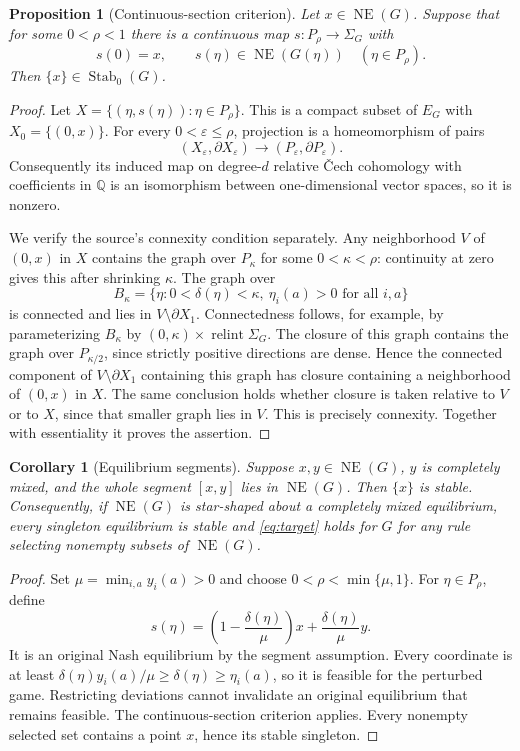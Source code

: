 \documentclass[11pt]{article}
\newtheorem{proposition}[theorem]{Proposition}
\newtheorem{corollary}[theorem]{Corollary}
\theoremstyle{definition}
\newcommand{\NE}{\operatorname{NE}}
\newcommand{\Stab}{\operatorname{Stab}_0}
\newcommand{\Q}{\mathbb Q}
\DeclareMathOperator{\relint}{relint}
\begin{document}
\begin{proposition}[Continuous-section criterion]\label{prop:section}
Let $x\in\NE(G)$. Suppose that for some $0<\rho<1$ there is a continuous map
$s:P_\rho\to\Sigma_G$ with
\[
 s(0)=x,\qquad s(\eta)\in\NE(G(\eta))\quad(\eta\in P_\rho).
\]
Then $\{x\}\in\Stab(G)$.
\end{proposition}
\begin{proof}
Let $X=\{(\eta,s(\eta)):\eta\in P_\rho\}$. This is a compact subset of $E_G$
with $X_0=\{(0,x)\}$. For every $0<\varepsilon\le\rho$, projection is a
homeomorphism of pairs
\[
 (X_\varepsilon,\partial X_\varepsilon)
 \longrightarrow(P_\varepsilon,\partial P_\varepsilon).
\]
Consequently its induced map on degree-$d$ relative \v Cech cohomology with
coefficients in $\Q$ is an isomorphism between one-dimensional vector spaces,
so it is nonzero.

We verify the source's connexity condition separately. Any neighborhood $V$
of $(0,x)$ in $X$ contains the graph over $P_\kappa$ for some
$0<\kappa<\rho$: continuity at zero gives this after shrinking $\kappa$.
The graph over
\[
 B_\kappa=\{\eta:0<\delta(\eta)<\kappa,\ \eta_i(a)>0\text{ for all }i,a\}
\]
is connected and lies in $V\setminus\partial X_1$.
Connectedness follows, for example, by parameterizing $B_\kappa$ by
$(0,\kappa)\times\relint\Sigma_G$. The closure of this graph contains the
graph over $P_{\kappa/2}$, since strictly positive directions are dense.
Hence the connected component of $V\setminus\partial X_1$ containing this
graph has closure containing a neighborhood of $(0,x)$ in $X$.
The same conclusion holds whether closure is taken relative to $V$ or to
$X$, since that smaller graph lies in $V$. This is precisely connexity.
Together with essentiality it proves the assertion.
\end{proof}

\begin{corollary}[Equilibrium segments]\label{cor:segment}
Suppose $x,y\in\NE(G)$, $y$ is completely mixed, and the whole segment
$[x,y]$ lies in $\NE(G)$. Then $\{x\}$ is stable.
Consequently, if $\NE(G)$ is star-shaped about a completely mixed equilibrium,
every singleton equilibrium is stable and \eqref{eq:target} holds for $G$
for \emph{any} rule selecting nonempty subsets of $\NE(G)$.
\end{corollary}
\begin{proof}
Set $\mu=\min_{i,a}y_i(a)>0$ and choose $0<\rho<\min\{\mu,1\}$.
For $\eta\in P_\rho$, define
\[
 s(\eta)=\left(1-\frac{\delta(\eta)}{\mu}\right)x+
                \frac{\delta(\eta)}{\mu}y.
\]
It is an original Nash equilibrium by the segment assumption. Every coordinate
is at least $\delta(\eta)y_i(a)/\mu\ge\delta(\eta)\ge\eta_i(a)$, so it is
feasible for the perturbed game. Restricting deviations cannot invalidate an
original equilibrium that remains feasible. The continuous-section criterion
applies. Every nonempty selected set contains a point $x$, hence its stable
singleton.
\end{proof}
\end{document}
